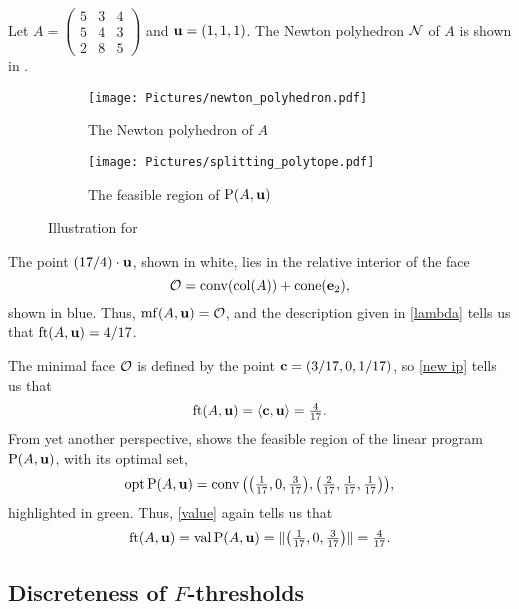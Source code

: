\documentclass[11pt]{amsart}
\begin{document}
\begin{example}\label{ex: ft}
   Let $A=\left(\begin{smallmatrix}5&3&4\\ 5&4&3\\ 2&8&5\end{smallmatrix}\right)$ and $\mathbf{u} = (1,1,1)$.
   The Newton polyhedron $\mathcal{N}$ of $A$ is shown in .
   \begin{figure}
   \centering
   \begin{subfigure}{.48\textwidth}
      \centering
      \texttt{[image: Pictures/newton\_polyhedron.pdf]}\\[1.4mm]
      \caption{The Newton polyhedron of $A$}
      \label{fig: newton polyhedron}
   \end{subfigure}
   \begin{subfigure}{.48\textwidth}
      \centering
      \texttt{[image: Pictures/splitting\_polytope.pdf]} 
      \caption{The feasible region of $\mathrm{P}(A,\mathbf{u})$}
      \label{fig: splitting polytope}
   \end{subfigure}
      \caption{Illustration for }
   \label{fig: newton polyhedron and splitting polytope}
   \end{figure}
   The point $(17/4)\cdot \mathbf{u}$, shown in white, lies in the relative interior of the face
   \[\mathcal{O} = \operatorname{conv}(\operatorname{col}(A)) + \operatorname{cone}(\mathbf{e}_2),\]
   shown in blue.
   Thus, $\operatorname{mf}(A,\mathbf{u}) = \mathcal{O}$, and the description given in \eqref{lambda} tells us that $\operatorname{ft}(A, \mathbf{u}) = 4/17$.

   The minimal face $\mathcal{O}$ is defined by the point $\mathbf{c} = (3/17, 0, 1/17)$, so \eqref{new ip} tells us that
   \[\operatorname{ft}(A, \mathbf{u}) = \langle \mathbf{c}, \mathbf{u} \rangle = \tfrac4{17}.\]
   From yet another perspective,  shows the feasible region of the linear program $\mathrm{P}(A,\mathbf{u})$, with its optimal set,
   \[\operatorname{opt} \mathrm{P}(A,\mathbf{u}) = \operatorname{conv}\big(\big(\tfrac1{17}, 0, \tfrac3{17}\big),\big(\tfrac2{17}, \tfrac1{17}, \tfrac1{17}\big)\big),\]
   highlighted in green.
   Thus, \eqref{value} again tells us that
   \[\operatorname{ft}(A, \mathbf{u}) = \operatorname{val} \mathrm{P}(A,\mathbf{u}) = \| \big(\tfrac1{17}, 0, \tfrac3{17}\big) \| = \tfrac4{17}.\]
\end{example}

\subsection{Discreteness of $F$-thresholds}
\end{document}
